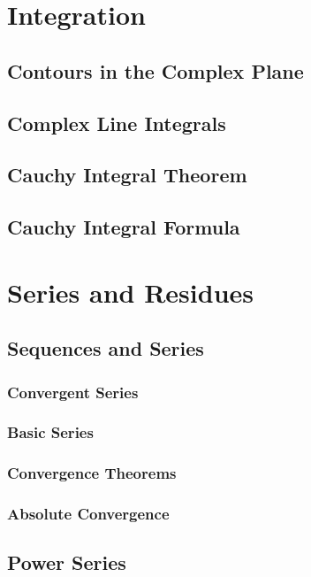 \newpage
\section{Integration}

\subsection{Contours in the Complex Plane}

\subsection{Complex Line Integrals}

\subsection{Cauchy Integral Theorem}

\subsection{Cauchy Integral Formula}


\newpage
\section{Series and Residues}

\subsection{Sequences and Series}
\subsubsection{Convergent Series}
\subsubsection{Basic Series}
\subsubsection{Convergence Theorems}
\subsubsection{Absolute Convergence}


\subsection{Power Series}

